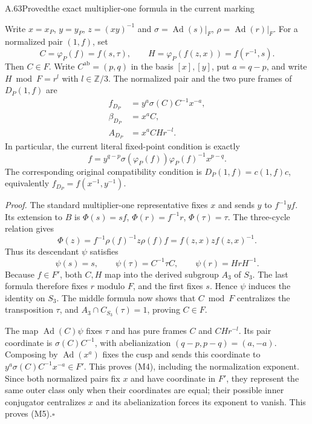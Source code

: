 \begin{statement}{A.63}{Proved}{the exact multiplier-one formula in the current marking}
\end{statement}
Write $x=x_P$, $y=y_P$, $z=(xy)^{-1}$ and
$\sigma=\operatorname{Ad}(s)|_F$, $\rho=\operatorname{Ad}(r)|_F$.
For a normalized pair $(1,f)$, set
\[
 C=\varphi_P(f)=f(s,\tau),\qquad
 H=\varphi_P(f(z,x))=f(r^{-1},s).
\]
Then $C\in F$. Write $C^{\mathrm{ab}}=(p,q)$ in the basis $[x],[y]$,
put $a=q-p$, and write $H\bmod F=r^l$ with $l\in\mathbb Z/3$.
The normalized pair and the two pure frames of $D_P(1,f)$ are
\[
 \begin{split}
 f_{D_P}&=y^a\sigma(C)C^{-1}x^{-a},\\
 \beta_{D_P}&=x^a C,\\
 A_{D_P}&=x^a CHr^{-l}.
 \end{split}                                                    \tag{M4}
\]
In particular, the current literal fixed-point condition is exactly
\[
             f=y^{q-p}\sigma(\varphi_P(f))\varphi_P(f)^{-1}
                    x^{p-q}.                                   \tag{M5}
\]
The corresponding original compatibility condition is
$D_P(1,f)=c(1,f)c$, equivalently
$f_{D_P}=f(x^{-1},y^{-1})$.

\emph{Proof.} The standard multiplier-one representative fixes $x$
and sends $y$ to $f^{-1}yf$. Its extension to $B$ is
$\Phi(s)=sf$, $\Phi(r)=f^{-1}r$, $\Phi(\tau)=\tau$.
The three-cycle relation gives
\[
 \Phi(z)=f^{-1}\rho(f)^{-1}z\rho(f)f
        =f(z,x)z f(z,x)^{-1}.
\]
Thus its descendant $\psi$ satisfies
\[
 \psi(s)=s,\qquad\psi(\tau)=C^{-1}\tau C,
 \qquad\psi(r)=HrH^{-1}.
\]
Because $f\in F'$, both $C,H$ map into the derived subgroup $A_3$
of $S_3$. The last formula therefore fixes $r$ modulo $F$, and the
first fixes $s$. Hence $\psi$ induces the identity on $S_3$.
The middle formula now shows that $C\bmod F$ centralizes the
transposition $\tau$, and $A_3\cap C_{S_3}(\tau)=1$, proving $C\in F$.

The map $\operatorname{Ad}(C)\psi$ fixes $\tau$ and has pure frames
$C$ and $CHr^{-l}$. Its pair coordinate is
$\sigma(C)C^{-1}$, with abelianization $(q-p,p-q)=(a,-a)$.
Composing by $\operatorname{Ad}(x^a)$ fixes the cusp and sends this
coordinate to $y^a\sigma(C)C^{-1}x^{-a}\in F'$. This proves (M4),
including the normalization exponent. Since both normalized pairs
fix $x$ and have coordinate in $F'$, they represent the same outer
class only when their coordinates are equal; their possible inner
conjugator centralizes $x$ and its abelianization forces its exponent
to vanish. This proves (M5).\hfill$\square$

